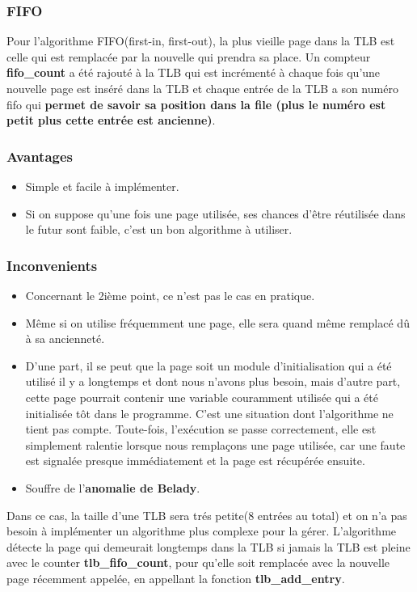 \documentclass{article}
\begin{document}
\subsubsection{FIFO}
Pour l’algorithme FIFO(first-in, first-out), la plus vieille page dans la TLB est celle qui est remplacée par la nouvelle qui prendra sa place.\newline 
Un compteur \textbf{fifo\_count} a été rajouté à la TLB qui est incrémenté à chaque fois qu’une nouvelle page est inséré dans la TLB et chaque entrée de la TLB a son numéro fifo qui \textbf{permet de savoir sa position dans la file (plus le numéro est petit plus cette entrée est ancienne)}.

\subsubsection*{Avantages}
\begin{itemize}
\item Simple et facile à implémenter.
\item Si on suppose qu’une fois une page utilisée, ses chances d’être réutilisée
dans le futur sont faible, c’est un bon algorithme à utiliser.
\end{itemize}

\subsubsection*{Inconvenients}
\begin{itemize}
\item Concernant le 2ième point, ce n’est pas le cas en pratique.
\item Même si on utilise fréquemment une page, elle sera quand même remplacé dû à sa ancienneté.
\item D’une part, il se peut que la page soit un module d’initialisation qui a été utilisé il y a longtemps et dont nous n’avons plus besoin, mais d’autre part, cette page pourrait contenir une variable
couramment utilisée qui a été initialisée tôt dans le programme.\newline
C’est une situation dont l’algorithme ne tient pas compte. Toute-fois, l’exécution se passe correctement, elle est simplement ralentie lorsque nous remplaçons une page utilisée, car une faute est signalée
presque immédiatement et la page est récupérée ensuite.
\item Souffre de l’\textbf{anomalie de Belady}.
\end{itemize}
Dans ce cas, la taille d'une TLB sera trés petite(8 entrées au total) et on n'a pas besoin à implémenter un algorithme plus complexe pour la gérer. L'algorithme détecte la page qui demeurait longtemps dans la TLB si jamais la TLB est pleine avec le counter \textbf{tlb\_fifo\_count}, pour qu'elle soit remplacée avec la nouvelle page récemment appelée, en appellant la fonction \textbf{tlb\_add\_entry}.
\end{document}
